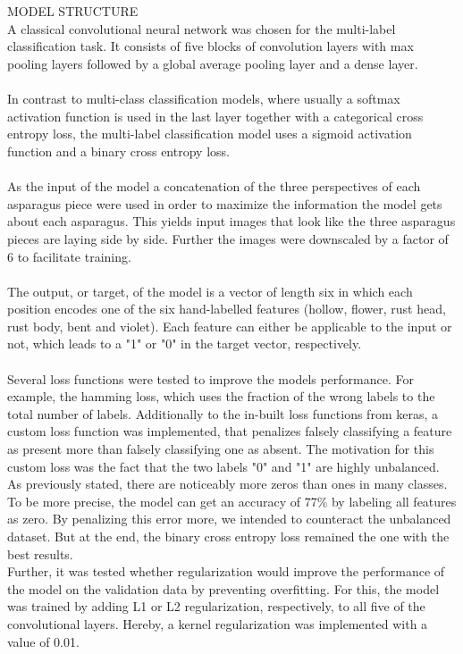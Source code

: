  \\
\\
MODEL STRUCTURE \\
A classical convolutional neural network was chosen for the multi-label classification task. It consists of five blocks of convolution layers with max pooling layers followed by a global average pooling layer and a dense layer. \\
\\
In contrast to multi-class classification models, where usually a softmax activation function is used in the last layer together with a categorical cross entropy loss, the multi-label classification model uses a sigmoid activation function and a binary cross entropy loss. \\
\\
As the input of the model a concatenation of the three perspectives of each asparagus piece were used in order to maximize the information the model gets about each asparagus. This yields input images that look like the three asparagus pieces are laying side by side. Further the images were downscaled by a factor of 6 to facilitate training. \\
\\
The output, or target, of the model is a vector of length six in which each position encodes one of the six hand-labelled features (hollow, flower, rust head, rust body, bent and violet). Each feature can either be applicable to the input or not, which leads to a "1" or "0" in the target vector, respectively. \\
\\
Several loss functions were tested to improve the models performance. For example, the hamming loss, which uses the fraction of the wrong labels to the total number of labels. Additionally to the in-built loss functions from keras, a custom loss function was implemented, that penalizes falsely classifying a feature as present more than falsely classifying one as absent. The motivation for this custom loss was the fact that the two labels "0" and "1" are highly unbalanced. As previously stated, there are noticeably more zeros than ones in many classes. To be more precise, the model can get an accuracy of 77\% by labeling all features as zero. By penalizing this error more, we intended to counteract the unbalanced dataset. But at the end, the binary cross entropy loss remained the one with the best results. \\
Further, it was tested whether regularization would improve the performance of the model on the validation data by preventing overfitting. For this, the model was trained by adding L1 or L2 regularization, respectively, to all five of the convolutional layers.  Hereby, a kernel regularization was implemented with a value of 0.01. \\

